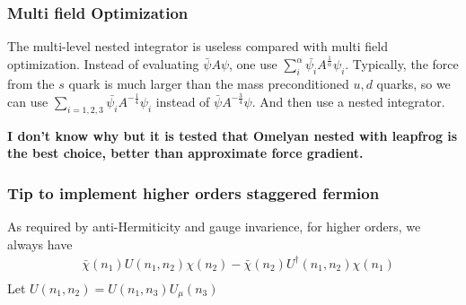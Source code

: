 \subsubsection{\label{sec:multifieldOptimization}Multi field Optimization}

The multi-level nested integrator is useless compared with multi field optimization. Instead of evaluating $\bar{\psi} A \psi$, one use $\sum _i^{\alpha} \bar{\psi _i} A^{\frac{1}{\alpha}} \psi _i$. Typically, the force from the $s$ quark is much larger than the mass preconditioned $u,d$ quarks, so we can use $\sum _{i=1,2,3} \bar{\psi _i} A^{-\frac{1}{4}} \psi _i$ instead of $\bar{\psi} A^{-\frac{3}{4}} \psi$. And then use a nested integrator.

\textbf{\textcolor[rgb]{0,0,1}{I don't know why but it is tested that Omelyan nested with leapfrog is the best choice, better than approximate force gradient.}}

\subsubsection{\label{sec:TipToImplementHigherOrdersStaggeredFermion}Tip to implement higher orders staggered fermion}

As required by anti-Hermiticity and gauge invarience, for higher orders, we always have
\begin{equation}
\begin{split}
&\bar{\chi}(n_1)U(n_1,n_2)\chi (n_2) - \bar{\chi}(n_2)U^{\dagger}(n_1,n_2)\chi (n_1)\\
\end{split}
\end{equation}
Let $U(n_1,n_2)=U(n_1,n_3)U_{\mu}(n_3)$